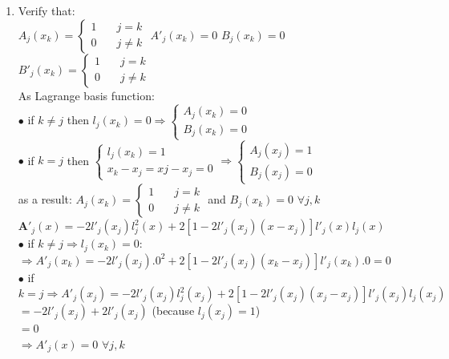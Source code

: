 \documentclass[14pt,a4paper]{article}
\begin{document}
	\begin{enumerate}
		\item Verify that: \\
		$A_j(x_k) = \begin{cases} 1 & \quad j = k \\ 0 & \quad j \neq k 	\end{cases} $ \hspace{0.5cm} $A'_j(x_k) = 0$ \hspace{0.5cm} $B_j(x_k) = 0$ \hspace{0.5cm} $B'_j(x_k) = \begin{cases}
		1 & \quad j = k  \\ 0 & \quad j \neq k 
		\end{cases} $ \\
		As Lagrange basis function: \\
		$\bullet$ if $k \neq j$ then $l_j(x_k) =0 \Rightarrow \begin{cases}  A_j(x_k) = 0 \\ B_j(x_k) = 0 \end{cases} $\\
		$\bullet$ if $k = j$ then $\begin{cases} l_j(x_k) = 1 \\ x_k - x_j = xj - x_j = 0 \end{cases} \Rightarrow \begin{cases} A_j(x_j) = 1 \\ B_j(x_j) = 0 \end{cases} $ \\
		as a result: \hspace{0.5cm} $A_j(x_k) = \begin{cases} 1 & \quad j = k \\ 0 & \quad j \neq k 	\end{cases} $ \hspace{0.5cm} and \hspace{0.5cm} $B_j(x_k) = 0$ \hspace{0.3cm}   $\forall j,k$ \\
		
		$ \textbf{A}'_j(x) = -2l'_j(x_j)l_j^2(x) + 2[1-2l'_j(x_j)(x-x_j)]l'_j(x)l_j(x)$\\
		\hspace*{1cm} $\bullet$ if $k \neq j \Rightarrow l_j(x_k) = 0 $:\\
		\hspace*{2.5cm} $\Rightarrow A'_j(x_k) = -2l'_j(x_j).0^2 + 2[1-2l'_j(x_j)(x_k-x_j)]l'_j(x_k).0 =0$\\
		\hspace*{1cm} $\bullet$ if $k = j \Rightarrow A'_j(x_j) = -2l'_j(x_j)l_j^2(x_j) + 2[1-2l'_j(x_j)(x_j-x_j)]l'_j(x_j)l_j(x_j)$\\
		\hspace*{4.65cm} $ = -2l'_j(x_j) + 2l'_j(x_j)$ \hspace{0.5cm}(because $l_j(x_j)=1$) \\
		\hspace*{4.65cm} $ = 0$ \\
		\hspace*{1.5cm} $ \Rightarrow A'_j(x) = 0$ \hspace{0.3cm} $\forall j,k$
		

\end{enumerate}
\end{document}
